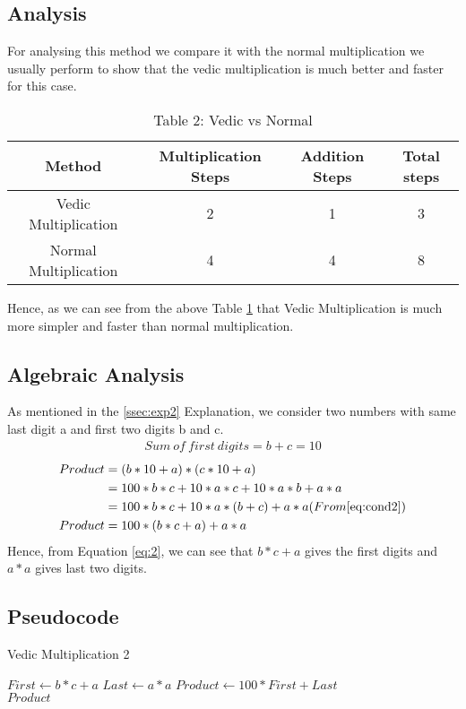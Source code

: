 \documentclass{article}
\begin{document}
\subsection{\large{Analysis}}
\hspace{3mm} For analysing this method we compare it with the normal multiplication we usually perform to show that the vedic multiplication is much better and faster for this case. 
\hfill \break
\begin{table}[h]
\label{table:2}
\caption{Table 2: Vedic vs Normal}
\begin{tabular}{|c|c|c|c|}
\hline
Method  &  Multiplication Steps  &  Addition Steps  &  Total steps\footnotemark\\
	\hline
	Vedic Multiplication  &  2  &  1  & 3\\
	\hline
	Normal Multiplication  & 4  &  4  & 8\\
	\hline
\end{tabular}
\end{table}
	\hfill \break
	\hspace{3mm} Hence, as we can see from the above Table \ref{table:2} that Vedic Multiplication is much more simpler and faster than normal multiplication.
\subsection{Algebraic Analysis}
\hspace{3mm} As mentioned in the \ref{ssec:exp2} Explanation, we consider two numbers with same last digit a and first two digits b and c.
\begin{align}
	Sum\ of\ first\ digits = b+c = 10 \label{eq:cond2}
\end{align}
\begin{align}
	Product &= (b*10 + a) * (c*10 +a) \\
			&= 100*b*c + 10*a*c + 10*a*b +a*a \\
			&= 100*b*c + 10*a*(b+c) + a*a (From \eqref{eq:cond2})\\
	Product &= 100*(b*c + a) + a*a \label{eq:2}
\end{align}
\hspace{3mm} Hence, from Equation \eqref{eq:2}, we can see that $b*c+a$ gives the first digits and $a*a$ gives last two digits.
\subsection{Pseudocode}
\begin{algorithm}
\caption{Vedic Multiplication 2}
\begin{algorithmic}
	\State $First \gets b*c+a$
	\State $Last \gets a*a$
	\State $Product \gets 100*First + Last$ \\
	\Return $Product$
\EndProcedure
\end{algorithmic}
\end{algorithm}
\end{document}
